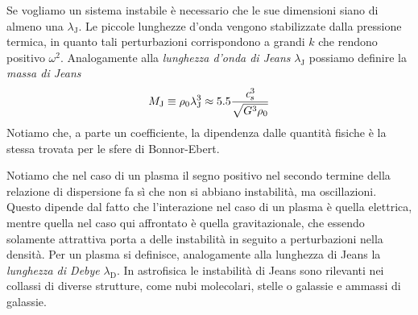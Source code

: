 Se vogliamo un sistema instabile è necessario che le sue dimensioni siano di almeno una $\lambda_\mathrm{J}$. Le piccole lunghezze d'onda vengono stabilizzate dalla pressione termica, in quanto tali perturbazioni corrispondono a grandi $k$ che rendono positivo $\omega^2$. Analogamente alla \textit{lunghezza d'onda di Jeans} $\lambda_\mathrm{J}$ possiamo definire la \textit{massa di Jeans}
\begin{equation}
M_\mathrm{J} \equiv \rho_0 \lambda_\mathrm{J}^3 \approx 5.5 \dfrac{\textit{c}_{s}^3}{\sqrt{G^3 \rho_0}}
\end{equation}
Notiamo che, a parte un coefficiente, la dipendenza dalle quantità fisiche è la stessa trovata per le sfere di Bonnor-Ebert.

Notiamo che nel caso di un plasma il segno positivo nel secondo termine della relazione di dispersione fa sì che non si abbiano instabilità, ma oscillazioni. Questo dipende dal fatto che l'interazione nel caso di un plasma è quella elettrica, mentre quella nel caso qui affrontato è quella gravitazionale, che essendo solamente attrattiva porta a delle instabilità in seguito a perturbazioni nella densità. Per un plasma si definisce, analogamente alla lunghezza di Jeans la \textit{lunghezza di Debye} $\lambda_\mathrm{D}$. In astrofisica le instabilità di Jeans sono rilevanti nei collassi di diverse strutture, come nubi molecolari, stelle o galassie e ammassi di galassie.
